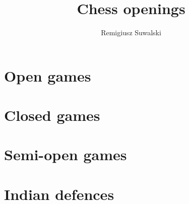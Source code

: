 \documentclass[a4paper,8pt]{extarticle}
\begin{document}
\author{Remigiusz Suwalski}
\title{Chess openings}
\section{Open games}

\section{Closed games}

\section{Semi-open games}

\section{Indian defences}

\end{document}
